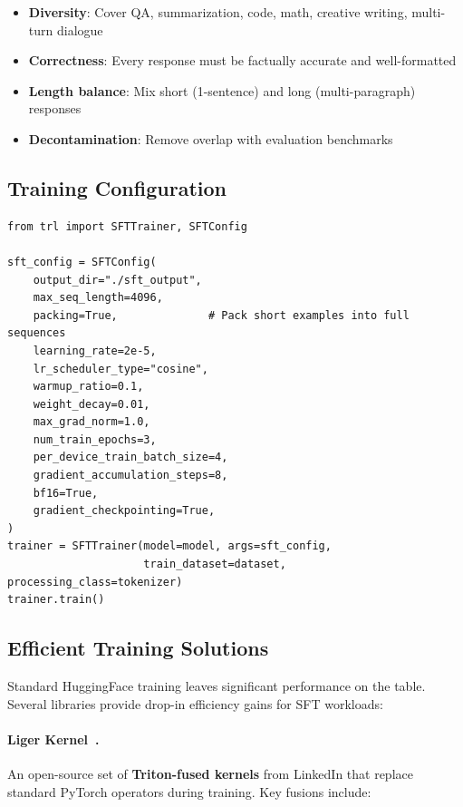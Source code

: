 \begin{itemize}
  \item \textbf{Diversity}: Cover QA, summarization, code, math, creative writing, multi-turn dialogue
  \item \textbf{Correctness}: Every response must be factually accurate and well-formatted
  \item \textbf{Length balance}: Mix short (1-sentence) and long (multi-paragraph) responses
  \item \textbf{Decontamination}: Remove overlap with evaluation benchmarks
\end{itemize}

\subsection{Training Configuration}
\label{training-configuration}

\begin{lstlisting}[style=pythonstyle]
from trl import SFTTrainer, SFTConfig

sft_config = SFTConfig(
    output_dir="./sft_output",
    max_seq_length=4096,
    packing=True,              # Pack short examples into full sequences
    learning_rate=2e-5,
    lr_scheduler_type="cosine",
    warmup_ratio=0.1,
    weight_decay=0.01,
    max_grad_norm=1.0,
    num_train_epochs=3,
    per_device_train_batch_size=4,
    gradient_accumulation_steps=8,
    bf16=True,
    gradient_checkpointing=True,
)
trainer = SFTTrainer(model=model, args=sft_config,
                     train_dataset=dataset, processing_class=tokenizer)
trainer.train()
\end{lstlisting}

\subsection{Efficient Training Solutions}
\label{efficient-training-solutions}

Standard HuggingFace training leaves significant performance on the table. Several libraries provide drop-in efficiency gains for SFT workloads:

\paragraph{Liger Kernel~\cite{hsu2024liger}.}
\label{liger-kernel-.}

An open-source set of \textbf{Triton-fused kernels} from LinkedIn that replace standard PyTorch operators during training. Key fusions include:

